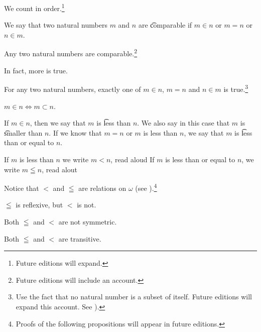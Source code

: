 

We count in order.\footnote{Future editions will expand.}


We say that two natural numbers $m$ and $n$ are \t{comparable} if $m \in n$ or $m = n$ or $n \in m$.

\begin{proposition}
	Any two natural numbers are comparable.\footnote{Future editions will include an account.}
\end{proposition}

In fact, more is true.

\begin{proposition}
	For any two natural numbers, exactly one of $m \in n$, $m = n$ and $n \in m$ is true.\footnote{Use the fact that no natural number is a subset of itself. Future editions will expand this account. See ).}
\end{proposition}

\begin{proposition}
	$m \in n \iff m \subset n$.
\end{proposition}

If $m \in n$, then we say that $m$ is \t{less than} $n$.
We also say in this case that $m$ is \t{smaller than} $n$.
If we know that $m = n$ or $m$ is less than $n$, we say that $m$ is \t{less than or equal to} $n$.


If $m$ is less than $n$ we write $m < n$, read aloud 
If $m$ is less than or equal to $n$, we write $m \leqq n$, read alout 


Notice that $<$ and $\leqq$ are relations on $\omega$ (see ).\footnote{Proofs of the following propositions will appear in future editions.}

\begin{proposition}[Reflexivity]
	$\leqq$ is reflexive, but
	$<$ is not.
\end{proposition}

\begin{proposition}[Symmetry]
	Both $\leqq$ and $<$ are not symmetric.
\end{proposition}

\begin{proposition}[Transitivity]
	Both $\leqq$ and $<$ are transitive.
\end{proposition}

